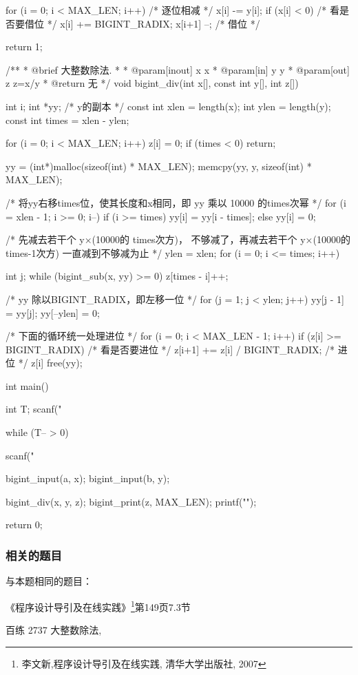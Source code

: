 \begin{Codex}[label=bigint_div.c]
{    for (i = 0; i < MAX_LEN; i++) {  /* 逐位相减 */
        x[i] -= y[i];
        if (x[i] < 0) {  /* 看是否要借位 */
            x[i] += BIGINT_RADIX;
            x[i+1] --;  /* 借位 */
        }
    }

    return 1;
}

/**
 * @brief 大整数除法.
 *
 * @param[inout] x x
 * @param[in] y y
 * @param[out] z z=x/y
 * @return 无
 */
void bigint_div(int x[], const int y[], int z[]) {
    int i;
    int *yy; /* y的副本 */
    const int xlen = length(x);
    int ylen = length(y);
    const int times = xlen - ylen;

    for (i = 0; i < MAX_LEN; i++) z[i] = 0;
    if (times < 0) return;

    yy = (int*)malloc(sizeof(int) * MAX_LEN);
    memcpy(yy, y, sizeof(int) * MAX_LEN);


    /* 将yy右移times位，使其长度和x相同，即 yy 乘以 10000 的times次幂 */
    for (i = xlen - 1; i >= 0; i--) {
        if (i >= times) yy[i] = yy[i - times];
        else yy[i] = 0;
    }

    /* 先减去若干个 y×(10000的 times次方)， 
      不够减了，再减去若干个 y×(10000的 times-1次方)
      一直减到不够减为止 */
    ylen = xlen;
    for (i = 0; i <= times; i++) {
        int j;
        while (bigint_sub(x, yy) >= 0) {
            z[times - i]++;
        }

        /* yy 除以BIGINT_RADIX，即左移一位 */
        for (j = 1; j < ylen; j++) {
            yy[j - 1] = yy[j];
        }
        yy[--ylen] = 0;
    }

    /* 下面的循环统一处理进位 */
    for (i = 0; i < MAX_LEN - 1; i++) {
        if (z[i] >= BIGINT_RADIX) {  /* 看是否要进位 */
            z[i+1] += z[i] / BIGINT_RADIX;  /* 进位 */
            z[i] %
        }
    }
    free(yy);
}

int main() {
    int T;    
    scanf("%

    while (T-- > 0) {
        scanf("%

        bigint_input(a, x);
        bigint_input(b, y);

        bigint_div(x, y, z);
        bigint_print(z, MAX_LEN);
        printf("\n"); 
    }
    return 0;
}
\end{Codex}

\subsubsection{相关的题目}
与本题相同的题目：
\begindot
\item 《程序设计导引及在线实践》\footnote{李文新,程序设计导引及在线实践, 清华大学出版社, 2007}第149页7.3节
\item 百练 2737 大整数除法, 
\myenddot


